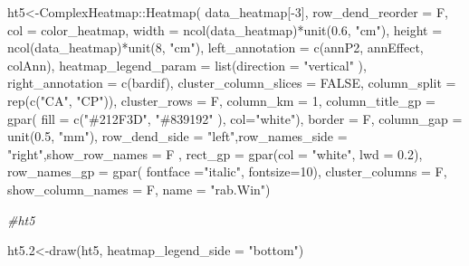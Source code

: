 \documentclass[]{interact}
\theoremstyle{plain}%
\theoremstyle{definition}
\theoremstyle{remark}
\newenvironment{Shaded}{\begin{snugshade}}{\end{snugshade}}
\newcommand{\AttributeTok}[1]{\textcolor[rgb]{0.77,0.63,0.00}{#1}}
\newcommand{\CommentTok}[1]{\textcolor[rgb]{0.56,0.35,0.01}{\textit{#1}}}
\newcommand{\ConstantTok}[1]{\textcolor[rgb]{0.00,0.00,0.00}{#1}}
\newcommand{\DecValTok}[1]{\textcolor[rgb]{0.00,0.00,0.81}{#1}}
\newcommand{\FloatTok}[1]{\textcolor[rgb]{0.00,0.00,0.81}{#1}}
\newcommand{\FunctionTok}[1]{\textcolor[rgb]{0.00,0.00,0.00}{#1}}
\newcommand{\NormalTok}[1]{#1}
\newcommand{\OtherTok}[1]{\textcolor[rgb]{0.56,0.35,0.01}{#1}}
\newcommand{\SpecialCharTok}[1]{\textcolor[rgb]{0.00,0.00,0.00}{#1}}
\newcommand{\StringTok}[1]{\textcolor[rgb]{0.31,0.60,0.02}{#1}}
\begin{document}
\begin{Shaded}
\begin{Highlighting}[]
\NormalTok{ht5}\OtherTok{\textless{}{-}}\NormalTok{ComplexHeatmap}\SpecialCharTok{::}\FunctionTok{Heatmap}\NormalTok{(}
\NormalTok{  data\_heatmap[}\SpecialCharTok{{-}}\DecValTok{3}\NormalTok{],  }
  \AttributeTok{row\_dend\_reorder =}\NormalTok{ F, }\AttributeTok{col =}\NormalTok{ color\_heatmap,}
  \AttributeTok{width =} \FunctionTok{ncol}\NormalTok{(data\_heatmap)}\SpecialCharTok{*}\FunctionTok{unit}\NormalTok{(}\FloatTok{0.6}\NormalTok{, }\StringTok{"cm"}\NormalTok{),}
  \AttributeTok{height =} \FunctionTok{ncol}\NormalTok{(data\_heatmap)}\SpecialCharTok{*}\FunctionTok{unit}\NormalTok{(}\DecValTok{8}\NormalTok{, }\StringTok{"cm"}\NormalTok{),}
  \AttributeTok{left\_annotation =}  \FunctionTok{c}\NormalTok{(annP2, annEffect, colAnn),}
  \AttributeTok{heatmap\_legend\_param =} \FunctionTok{list}\NormalTok{(}\AttributeTok{direction =} \StringTok{"vertical"}\NormalTok{ ),}
  \AttributeTok{right\_annotation =} \FunctionTok{c}\NormalTok{(bardif),}
  \AttributeTok{cluster\_column\_slices =} \ConstantTok{FALSE}\NormalTok{,}
  \AttributeTok{column\_split =} \FunctionTok{rep}\NormalTok{(}\FunctionTok{c}\NormalTok{(}\StringTok{"CA"}\NormalTok{, }\StringTok{"CP"}\NormalTok{)),}
  \AttributeTok{cluster\_rows =}\NormalTok{ F,}
  \AttributeTok{column\_km =} \DecValTok{1}\NormalTok{, }\AttributeTok{column\_title\_gp =} \FunctionTok{gpar}\NormalTok{(}
  \AttributeTok{fill =} \FunctionTok{c}\NormalTok{(}\StringTok{"\#212F3D"}\NormalTok{, }\StringTok{"\#839192"}\NormalTok{ ), }\AttributeTok{col=}\StringTok{"white"}\NormalTok{),}
  \AttributeTok{border =}\NormalTok{ F, }\AttributeTok{column\_gap =} \FunctionTok{unit}\NormalTok{(}\FloatTok{0.5}\NormalTok{, }\StringTok{"mm"}\NormalTok{), }
  \AttributeTok{row\_dend\_side =} \StringTok{"left"}\NormalTok{,}\AttributeTok{row\_names\_side =} \StringTok{"right"}\NormalTok{,}\AttributeTok{show\_row\_names =}\NormalTok{ F ,}
  \AttributeTok{rect\_gp =} \FunctionTok{gpar}\NormalTok{(}\AttributeTok{col =} \StringTok{"white"}\NormalTok{, }\AttributeTok{lwd =} \FloatTok{0.2}\NormalTok{), }\AttributeTok{row\_names\_gp =} \FunctionTok{gpar}\NormalTok{(}
  \AttributeTok{fontface =}\StringTok{"italic"}\NormalTok{, }\AttributeTok{fontsize=}\DecValTok{10}\NormalTok{),}
  \AttributeTok{cluster\_columns =}\NormalTok{ F,}
  \AttributeTok{show\_column\_names =}\NormalTok{ F, }\AttributeTok{name =} \StringTok{"rab.Win"}\NormalTok{)}

\CommentTok{\#ht5}

\NormalTok{ht5}\FloatTok{.2}\OtherTok{\textless{}{-}}\FunctionTok{draw}\NormalTok{(ht5, }\AttributeTok{heatmap\_legend\_side =} \StringTok{"bottom"}\NormalTok{)}
\end{Highlighting}
\end{Shaded}
\end{document}
